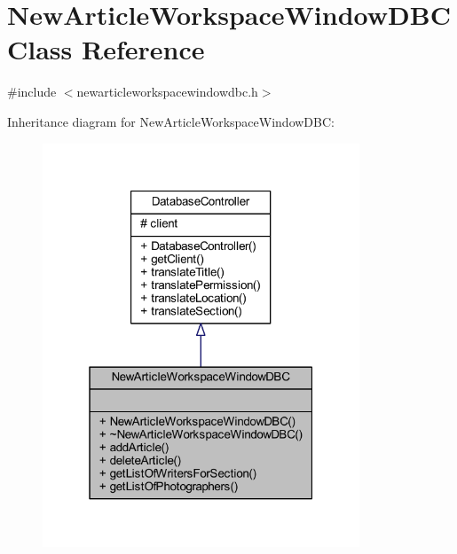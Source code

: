 \hypertarget{class_new_article_workspace_window_d_b_c}{}\section{New\+Article\+Workspace\+Window\+D\+B\+C Class Reference}
\label{class_new_article_workspace_window_d_b_c}


{\ttfamily \#include $<$newarticleworkspacewindowdbc.\+h$>$}



Inheritance diagram for New\+Article\+Workspace\+Window\+D\+B\+C\+:
\nopagebreak
\begin{figure}[H]
\begin{center}
\leavevmode
\includegraphics[width=268pt]{class_new_article_workspace_window_d_b_c__inherit__graph}
\end{center}
\end{figure}


